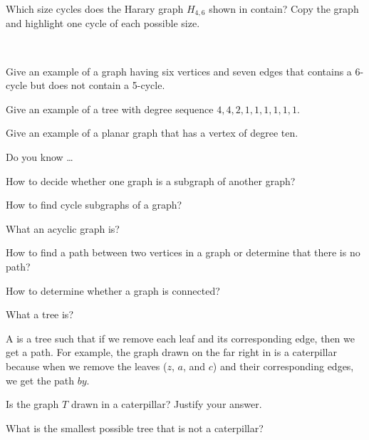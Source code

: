\begin{exer}[\exerU] %
\label{exer_which_cycles}
    Which size cycles does the Harary graph $H_{4,6}$ shown in  contain?  Copy the graph and highlight one cycle of each possible size.
\end{exer}

\begin{exer}[\exerU] %
\label{exer_subgraph_examples}
~
    \begin{exerpart}
        \item Give an example of a graph having six vertices and seven edges that contains a 6-cycle but does not contain a 5-cycle.
        \item Give an example of a tree with degree sequence $4,4,2,1,1,1,1,1,1$.
        \item Give an example of a planar graph that has a vertex of degree ten.
    \end{exerpart}
\end{exer}

\begin{exer}[\exerR] %
\label{exer_dyk_subgraphs}
    Do you know \ldots
        \begin{exerpart}
            \item How to decide whether one graph is a subgraph of another graph?
            \item How to find cycle subgraphs of a graph?
            \item What an acyclic graph is?      
            \item How to find a path between two vertices in a graph or determine that there is no path?
            \item How to determine whether a graph is connected?
            \item What a tree is? 
        \end{exerpart}
\end{exer}

\begin{exer}[\exerE] %
\label{exer_caterpillars}
    A  is a tree such that if we remove each leaf and its corresponding edge, then we get a path. For example, the graph drawn on the far right in  is a caterpillar because when we remove the leaves ($z$, $a$, and $c$) and their corresponding edges, we get the path $by$.
        \begin{exerpart}
            \item Is the graph $T$ drawn in  a caterpillar?  Justify your answer.
            \item What is the smallest possible tree that is not a caterpillar?
        \end{exerpart}    
\end{exer}

